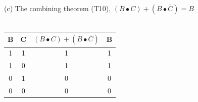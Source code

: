 \documentclass[12pt,a4paper]{report}
\newcommand*{\cl}{\overline{C}}
\begin{document}
\begin{normalsize}
(c) The combining theorem (T10), $ (B \bullet C) + (B \bullet \cl{}) = B $ \\ \\
\begin{tabular}{|c|c|c|c|}
B & C & $ (B \bullet C) + (B \bullet \cl{}) $ & B \\
\hline 
1 & 1 & 1 & 1 \\ 
\hline 
1 & 0 & 1 & 1 \\ 
\hline 
0 & 1 & 0 & 0 \\ 
\hline 
0 & 0 & 0 & 0 \\ 
\hline 
\end{tabular} \\ \\

\end{normalsize}
\end{document}
